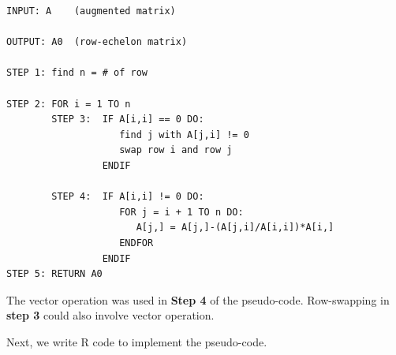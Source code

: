 \documentclass[
]{book}
\begin{document}
\begin{verbatim}
INPUT: A    (augmented matrix)

OUTPUT: A0  (row-echelon matrix)

STEP 1: find n = # of row

STEP 2: FOR i = 1 TO n
        STEP 3:  IF A[i,i] == 0 DO: 
                    find j with A[j,i] != 0
                    swap row i and row j
                 ENDIF
         
        STEP 4:  IF A[i,i] != 0 DO:
                    FOR j = i + 1 TO n DO: 
                       A[j,] = A[j,]-(A[j,i]/A[i,i])*A[i,]
                    ENDFOR
                 ENDIF
STEP 5: RETURN A0   
\end{verbatim}

The vector operation was used in \textbf{Step 4} of the pseudo-code. Row-swapping in \textbf{step 3} could also involve vector operation.

Next, we write R code to implement the pseudo-code.
\end{document}
